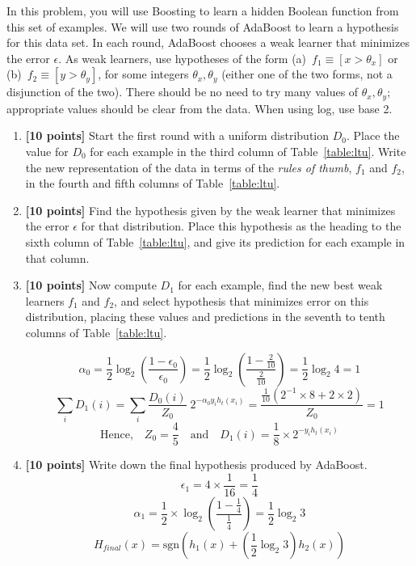\documentclass[11pt]{article}
\begin{document}
  In this problem, you will use Boosting to learn a hidden Boolean function from this set of examples.
We will use two rounds of AdaBoost to learn a hypothesis for this
    data set. In each round, AdaBoost chooses a weak learner that minimizes the error $\epsilon$. As weak learners, use hypotheses of the form (a)~$f_1 \equiv [x
    > \theta_x]$ or (b)~$f_2 \equiv [y > \theta_y]$, for some integers $\theta_x, \theta_y$ (either one of the two forms, not a disjunction of the two). There should be no need to try many values of $\theta_x, \theta_y$;
    appropriate values should be clear from the data. When using log, use base 2. 


  \begin{enumerate}
  \item {\bf [10 points]}  Start the first round with a uniform distribution $D_0$.  Place the value for $D_0$ for each example in the third column of Table~\ref{table:ltu}. Write the new representation of the data in terms of the {\em rules of thumb}, $f_1$ and $f_2$, in the fourth and fifth columns of Table~\ref{table:ltu}.

  

  \item {\bf [10 points]}
    Find the hypothesis given by the weak learner that minimizes the error
    $\epsilon$ for that distribution.  Place this hypothesis as the heading to the
    sixth column of Table~\ref{table:ltu}, and give its prediction for each example in that column.

  \item {\bf [10 points]} Now compute $D_1$ for each example, find the new best weak learners $f_1$ and $f_2$, and select hypothesis that minimizes error on this distribution, placing these values and predictions in the seventh to tenth columns of Table~\ref{table:ltu}.
  
  $$\alpha_0 = \frac{1}{2}\log_2{\left(\frac{1-\epsilon_0}{\epsilon_0}\right)} = \frac{1}{2}\log_2{\left(\frac{1-\frac{2}{10}}{\frac{2}{10}}\right)} = \frac{1}{2}\log_2{4} = 1$$
  $$\sum_i{D_1(i)} = \sum_i{\frac{D_0(i)}{Z_0}\;2^{-\alpha_0y_ih_t(x_i)}} = \frac{\frac{1}{10}(2^{-1}\times8 + 2\times2)}{Z_0} = 1$$
  $$\text{Hence,}\quad Z_0 = \frac{4}{5}\quad \text{and}\quad D_1(i) = \frac{1}{8}\times2^{-y_ih_t(x_i)}$$


  \item {\bf [10 points]} Write down the final hypothesis produced by AdaBoost.
  $$\epsilon_1 = 4\times\frac{1}{16} = \frac{1}{4}$$
  $$\alpha_1 = \frac{1}{2} \times \log_2{\left(\frac{1-\frac{1}{4}}{\frac{1}{4}}\right)} = \frac{1}{2}\log_2{3}$$
  $$H_{final}(x) = \text{sgn}\left(h_1(x) + \left(\frac{1}{2}\log_2{3}\right)h_2(x)\right)$$

\end{enumerate}
\end{document}
